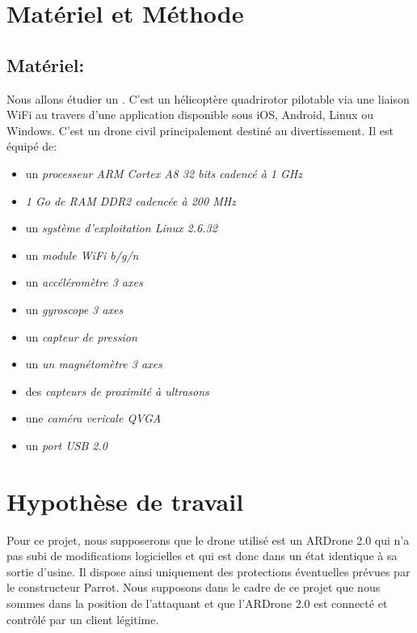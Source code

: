 \section{Matériel et Méthode}
\subsection{Matériel: }
Nous allons étudier un . C'est un hélicoptère quadrirotor pilotable via une liaison WiFi au travers d'une application disponible sous iOS, Android, Linux ou Windows. C'est un drone civil principalement destiné au divertissement. Il est équipé de:
\medbreak
\begin{itemize}
    \item un \textit{processeur ARM Cortex A8 32 bits cadencé à 1 GHz}
    \item \textit{1 Go de RAM DDR2 cadencée à 200 MHz}
    \item un \textit{système d'exploitation Linux 2.6.32}
    \item un \textit{module WiFi b/g/n}
    \item un \textit{accéléromètre 3 axes}
    \item un \textit{gyroscope 3 axes}
    \item un \textit{capteur de pression}
    \item un \textit{un magnétomètre 3 axes}
    \item des \textit{capteurs de proximité à ultrasons}
    \item une \textit{caméra vericale QVGA}
    \item un \textit{port USB 2.0}
\end{itemize}

\newpage
\section{Hypothèse de travail}
Pour ce projet, nous supposerons que le drone utilisé est un ARDrone 2.0 qui n'a pas subi de modifications logicielles et qui est donc dans un état identique à sa sortie d'usine. Il dispose ainsi uniquement des protections éventuelles prévues par le constructeur Parrot. Nous supposons dans le cadre de ce projet que nous sommes  dans la position de l'attaquant et que l'ARDrone 2.0 est connecté et contrôlé par un client légitime.
